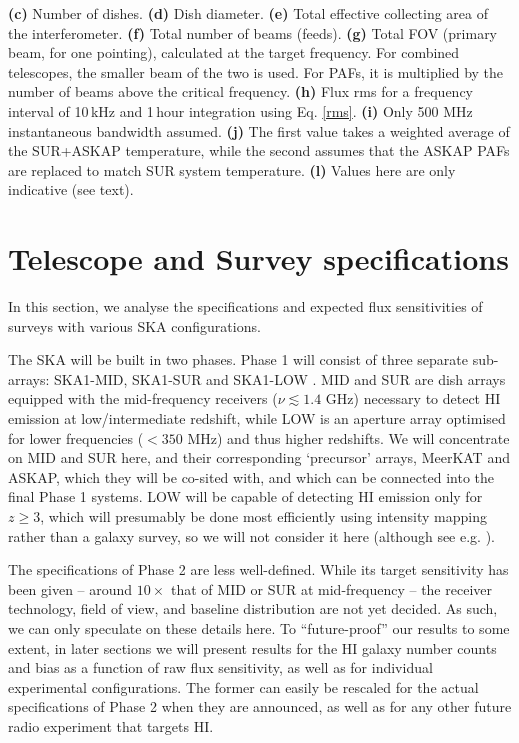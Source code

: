 \documentclass[useAMS,usenatbib]{mn2e}
\begin{document}
\begin{table}
{{\bf (c)} Number of dishes.
{\bf (d)} Dish diameter.
{\bf (e)} Total effective collecting area of the interferometer.
{\bf (f)} Total number of beams (feeds). 
{\bf (g)} Total FOV (primary beam, for one pointing), calculated at the target frequency. For combined telescopes, the smaller beam of the two is used. For PAFs, it is multiplied by the number of beams above the critical frequency.
{\bf (h)}  Flux rms for a frequency interval of 10\,kHz and 1\,hour integration using Eq. \eqref{rms}.
{\bf (i)} Only 500 MHz instantaneous bandwidth assumed.
{\bf (j)} The first value takes a weighted average of the SUR+ASKAP temperature, while the second assumes that the ASKAP PAFs are replaced to match SUR system temperature.
{\bf (l)} Values here are only indicative (see text).}
\label{tab:telescopes}
\end{table}

\section{Telescope and Survey specifications}

In this section, we analyse the specifications and expected flux sensitivities of surveys with various SKA configurations.

The SKA will be built in two phases. Phase 1 will consist of three separate sub-arrays: SKA1-MID, SKA1-SUR and SKA1-LOW \citep{dewdney2013ska1}. MID and SUR are dish arrays equipped with the mid-frequency receivers ($\nu \lesssim 1.4$ GHz) necessary to detect HI emission at low/intermediate redshift, while LOW is an aperture array optimised for lower frequencies ($< 350$ MHz) and thus higher redshifts. We will concentrate on MID and SUR here, and their corresponding `precursor' arrays, MeerKAT and ASKAP, which they will be co-sited with, and which can be connected into the final Phase 1 systems. LOW will be capable of detecting HI emission only for $z \ge 3$, which will presumably be done most efficiently using intensity mapping rather than a galaxy survey, so we will not consider it here (although see e.g. \citealt{Villaescusa-Navarro:2014rra}).

The specifications of Phase 2 are less well-defined. While its target sensitivity has been given -- around $10\times$ that of MID or SUR at mid-frequency -- the receiver technology, field of view, and baseline distribution are not yet decided. As such, we can only speculate on these details here. To ``future-proof'' our results to some extent, in later sections we will present results for the HI galaxy number counts and bias as a function of raw flux sensitivity, as well as for individual experimental configurations. The former can easily be rescaled for the actual specifications of Phase 2 when they are announced, as well as for any other future radio experiment that targets HI.
\end{document}
